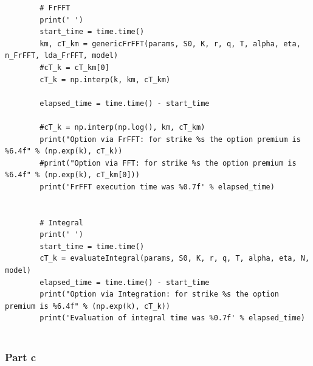 \documentclass[margin=1in]{article}
\begin{document}
\begin{lstlisting}
       	# FrFFT
       	print(' ')
       	start_time = time.time()
       	km, cT_km = genericFrFFT(params, S0, K, r, q, T, alpha, eta, n_FrFFT, lda_FrFFT, model)
       	#cT_k = cT_km[0]
       	cT_k = np.interp(k, km, cT_km)
       	
       	elapsed_time = time.time() - start_time
       	
       	#cT_k = np.interp(np.log(), km, cT_km)
       	print("Option via FrFFT: for strike %s the option premium is %6.4f" % (np.exp(k), cT_k))
       	#print("Option via FFT: for strike %s the option premium is %6.4f" % (np.exp(k), cT_km[0]))
       	print('FrFFT execution time was %0.7f' % elapsed_time)
       	
       	
       	# Integral
       	print(' ')
       	start_time = time.time()
       	cT_k = evaluateIntegral(params, S0, K, r, q, T, alpha, eta, N, model)
       	elapsed_time = time.time() - start_time
       	print("Option via Integration: for strike %s the option premium is %6.4f" % (np.exp(k), cT_k))
       	print('Evaluation of integral time was %0.7f' % elapsed_time)
       	
       	 \end{lstlisting}
	
\subsubsection*{Part c}
   
\end{document}
